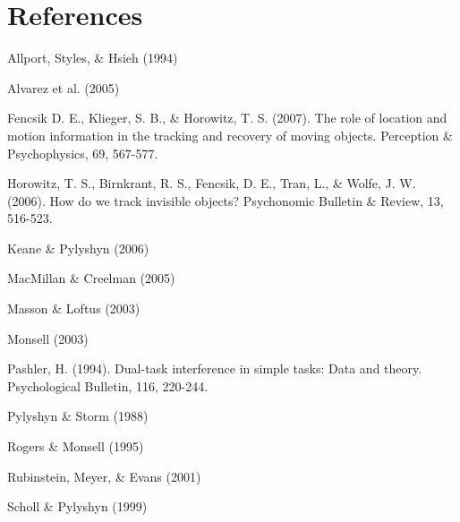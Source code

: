\documentclass[man,nobf]{apa}
\begin{document}
\section{References}

Allport, Styles, \& Hsieh (1994)

Alvarez et al. (2005)

Fencsik D. E., Klieger, S. B., \& Horowitz, T. S. (2007). The role of
location and motion information in the tracking and recovery of moving
objects. Perception \& Psychophysics, 69, 567-577.

Horowitz, T. S., Birnkrant, R. S., Fencsik, D. E., Tran, L., \& Wolfe,
J. W. (2006). How do we track invisible objects? Psychonomic Bulletin \&
Review, 13, 516-523.

Keane \& Pylyshyn (2006)

MacMillan \& Creelman (2005)

Masson \& Loftus (2003)

Monsell (2003)

Pashler, H. (1994). Dual-task interference in simple tasks: Data and
theory. Psychological Bulletin, 116, 220-244.

Pylyshyn \& Storm (1988)

Rogers \& Monsell (1995)

Rubinstein, Meyer, \& Evans (2001)

Scholl \& Pylyshyn (1999)


\end{document}
